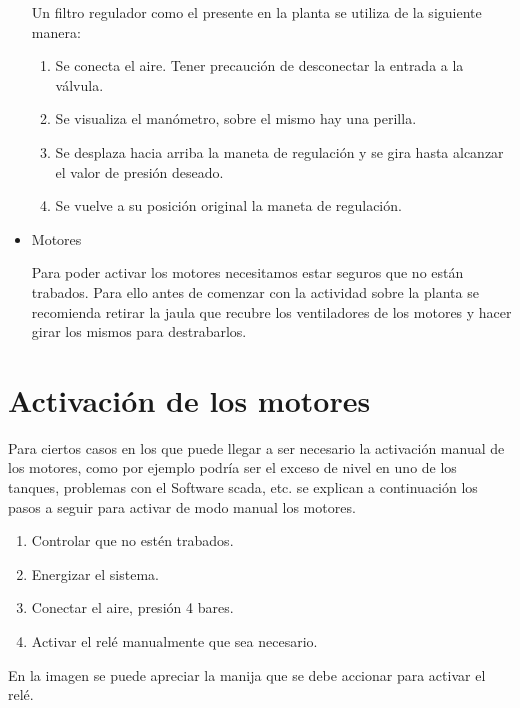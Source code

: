 \begin{itemize}
 Un filtro regulador como el presente en la planta se utiliza de la siguiente manera:
 
 \begin{enumerate}
  \item Se conecta el aire. Tener precaución de desconectar la entrada a la válvula. 
  \item Se visualiza el manómetro, sobre el mismo hay una perilla.
  \item Se desplaza hacia arriba la maneta de regulación y se gira hasta alcanzar el
  valor de presión deseado.
  \item Se vuelve a su posición original la maneta de regulación.
 \end{enumerate}

 
 
 \item Motores
 
 Para poder activar los motores necesitamos estar seguros que no están trabados.
 Para ello antes de comenzar con la actividad sobre la planta se recomienda retirar
 la jaula que recubre los ventiladores de los motores y hacer girar los mismos
 para destrabarlos.
 
 \end{itemize}

 
 \section{Activación de los motores}
 
 Para ciertos casos en los que puede llegar a ser necesario la activación 
 manual de los motores, como por ejemplo podría ser el exceso de nivel en 
 uno de los tanques, problemas con el Software \gls{scada}, etc. se explican
 a continuación los pasos a seguir para activar de modo manual los motores.

  \begin{enumerate}
   \item Controlar que no estén trabados.
   \item Energizar el sistema.
   \item Conectar el aire, presión 4 bares.
   \item Activar el relé manualmente que sea necesario.
  \end{enumerate}
  
  En la imagen se puede apreciar la manija que se debe accionar para activar 
  el relé.
